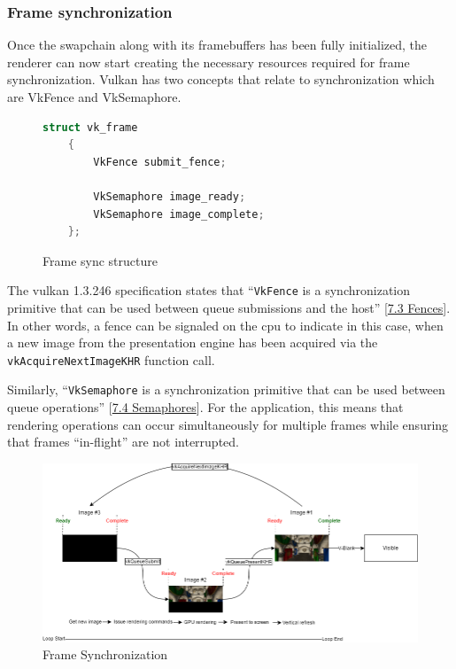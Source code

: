 \documentclass[11pt]{article}
\begin{document}
\subsubsection{Frame synchronization}
Once the swapchain along with its framebuffers has been fully initialized, the
renderer can now start creating the necessary resources required for frame
synchronization. Vulkan has two concepts that relate to synchronization which
are VkFence and VkSemaphore.

\begin{figure}[H]
  \centering
  \begin{lstlisting}[language=C++]
    struct vk_frame
    {
        VkFence submit_fence;

        VkSemaphore image_ready;
        VkSemaphore image_complete;
    };
  \end{lstlisting}
  \caption{Frame sync structure}
  \label{fig:vk_fence}
\end{figure}

The \gls*{vulkan} 1.3.246 specification states that  ``\lstinline{VkFence} is a
synchronization primitive that can be used between queue submissions and the
host''
[\href{https://registry.khronos.org/vulkan/specs/1.3-extensions/man/html/VkFence.html}{7.3
Fences}]. In other words, a fence can be signaled on the \gls*{cpu} to indicate
in this case, when a new image from the presentation engine has been acquired
via the \lstinline{vkAcquireNextImageKHR} function call.

Similarly, ``\lstinline{VkSemaphore} is a synchronization primitive that can be
used between queue operations''
[\href{https://registry.khronos.org/vulkan/specs/1.3-extensions/man/html/VkSemaphore.html}{7.4
Semaphores}]. For the application, this means that rendering operations can
occur simultaneously for multiple frames while ensuring that frames
``in-flight'' are not interrupted.


\begin{figure}[H]
  \centering
  \includegraphics[width=\textwidth]{images/frame_sync.png}
  \caption{Frame Synchronization}
  \label{fig:frame_sync}
\end{figure}
\end{document}
